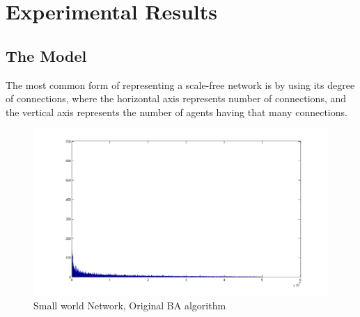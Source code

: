 
\chapter{Experimental Results} %

\label{Chapter4} %



\section{The Model}

The most common form of representing a scale-free network is by using its degree of connections, where the horizontal axis represents number of connections, and the vertical axis represents the number of agents having that many connections.

\begin{figure}
\centering
\includegraphics[scale=0.5]{Figures/50000m1_small_world}
\caption[Small World Network with Original Algorithm]{Small world Network, Original BA algorithm}
\label{fig:small_world_original}
\end{figure}

